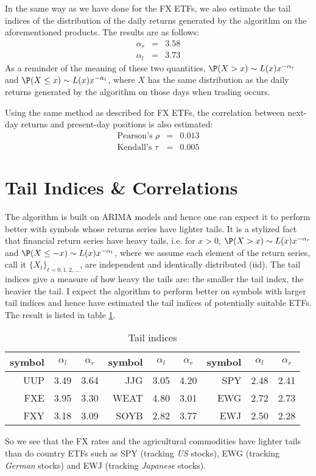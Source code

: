 \documentclass[12pt]{article}
\begin{document}
In the same way as we have done for the FX ETFs, we also estimate the
tail indices of the distribution of the daily returns generated by the
algorithm on the aforementioned products. The results are as follows:
\begin{eqnarray*}
  \alpha_r &=& 3.58 \\
  \alpha_l &=& 3.73
\end{eqnarray*}
As a reminder of the meaning of these two quantities, $\P(X > x) \sim
L(x) x^{-\alpha_r}$ and $\P(X \leq x) \sim L(x) x^{-\alpha_l}$, where
$X$ has the same distribution as the daily returns generated by the
algorithm on those days when trading occurs.

Using the same method as described for FX ETFs, the correlation
between next-day returns and present-day positions is also estimated:
\begin{eqnarray*}
  \text{Pearson's } \rho &=& 0.013 \\
  \text{Kendall's } \tau &=& 0.005
\end{eqnarray*}

\section{Tail Indices \& Correlations}\label{sec:TailIndices}
The algorithm is built on ARIMA models and hence one can expect it to
perform better with symbols whose returns series have lighter
tails. It is a stylized fact that financial return series have heavy
tails, i.e. for $x > 0$, $\P(X > x)\sim L(x) x^{-\alpha_r}$ and
$\P(X \leq -x)\sim L(x) x^{-\alpha_l}$, where we assume each element
of the return series, call it $\{X_t\}_{t=0,1,2,\dots}$, are
independent and identically distributed (iid). The tail indices give a
measure of how heavy the tails are: the smaller the tail index, the
heavier the tail. I expect the algorithm to perform better on symbols
with larger tail indices and hence have estimated the tail indices of
potentially suitable ETFs. The result is listed in table
\ref{tab:TailIndices}.
\begin{table}[htb!]
  \centering
  \begin{tabular}{r|c|c||r|c|c||r|c|c}
    symbol & $\alpha_l$ & $\alpha_r$
    & symbol & $\alpha_l$ & $\alpha_r$
    & symbol & $\alpha_l$ & $\alpha_r$ \\
    \hline
    UUP & 3.49 & 3.64 
    & JJG & 3.05 & 4.20 
    & SPY & 2.48 & 2.41 \\
    FXE & 3.95 & 3.30 
    & WEAT & 4.80 & 3.01
    & EWG & 2.72 & 2.73 \\
    FXY & 3.18 & 3.09 
    & SOYB & 2.82 & 3.77 
    & EWJ & 2.50 & 2.28
  \end{tabular}
  \caption{Tail indices}
  \label{tab:TailIndices}
\end{table}
So we see that the FX rates and the agricultural commodities have lighter
tails than do country ETFs such as SPY (tracking {\it US} stocks), EWG
(tracking {\it German} stocks) and EWJ (tracking {\it Japanese}
stocks).
\end{document}
